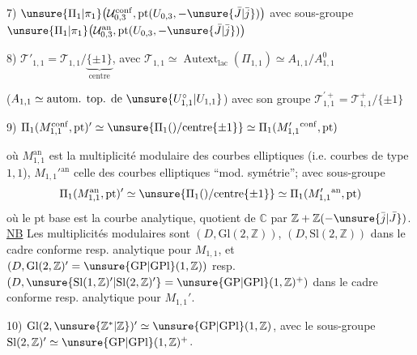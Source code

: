 
7) $\unsure{\Pi_1|\pi_1}\bigl(\mathcal U_{0,3}^{\mathrm{conf}},\operatorname{pt}(U_{0,3},-\unsure{\bar J|\bar j})\bigr)$
avec sous-groupe $\unsure{\Pi_1|\pi_1}\bigl(\mathcal U_{0,3}^{\mathrm{an}},\operatorname{pt}(U_{0,3},-\unsure{\bar J|\bar j})\bigr)$


8) $\mathcal T'_{1,1}=\mathcal T_{1,1}/\underbrace{\{\pm1\}}_{\text{centre}}$,
avec $\mathcal T_{1,1}\simeq\operatorname{Autext}_{\mathrm{lac}}(\Pi_{1,1})
\simeq A_{1,1}/A_{1,1}^{0}$

($A_{1,1}\simeq\text{autom. top. de }\unsure{U_{1,1}^{\circ}|U_{1,1}}$)
avec son groupe $\mathcal T_{1,1}^{\prime+}=\mathcal T_{1,1}^{+}/\{\pm1\}$


9) $\Pi_1(M_{1,1}^{\mathrm{conf}},\mathrm{pt})' \simeq \unsure{\Pi_1()/\mathrm{centre}\{\pm1\}} \simeq \Pi_1(M_{1,1}'{}^{\mathrm{conf}},\mathrm{pt})$

où $M_{1,1}^{\mathrm{an}}$ est la multiplicité modulaire  des courbes elliptiques  (i.e. courbes  de type $1,1$), $M_{1,1}'{}^{\mathrm{an}}$ celle des courbes elliptiques  ``mod. symétrie''; avec sous-groupe
\[
\Pi_1(M_{1,1}^{\mathrm{an}},\mathrm{pt})' \simeq \unsure{\Pi_1()/\mathrm{centre}\{\pm1\}} \simeq \Pi_1(M_{1,1}'{}^{\mathrm{an}},\mathrm{pt})
\]
où le pt base est la courbe  analytique, quotient de $\mathbb C$ par $\mathbb Z+\mathbb Z(-\unsure{\bar j|\bar J})$. \uline{NB} Les multiplicités modulaires sont $(D,\mathrm{Gl}(2,\mathbb Z))$, $(D,\mathrm{Sl}(2,\mathbb Z))$ dans le cadre  conforme resp. analytique pour $M_{1,1}$, et $(D,\mathrm{Gl}(2,\mathbb Z)'=\unsure{\mathrm{GP}|\mathrm{GPl}}(1,\mathbb Z))$ resp. $(D,\unsure{\mathrm{Sl}(1,\mathbb Z)'|\mathrm{Sl}(2,\mathbb Z)'}=\unsure{\mathrm{GP}|\mathrm{GPl}}(1,\mathbb Z)^+)$ dans le cadre conforme resp. analytique pour $M_{1,1}'$.

10) $\mathrm{Gl}(2,\unsure{\mathbb Z^{\ast}|\mathbb Z})' \simeq \unsure{\mathrm{GP}|\mathrm{GPl}}(1,\mathbb Z)$, avec le sous-groupe $\mathrm{Sl}(2,\mathbb Z)'\simeq\unsure{\mathrm{GP}|\mathrm{GPl}}(1,\mathbb Z)^+$.

